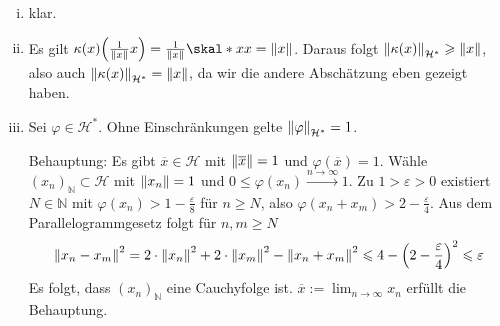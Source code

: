 \begin{enumerate}[(i)]
	\item klar.
	\item Es gilt $\kappa(x) \enbrace*{\frac{1}{\norm{x}}x }= \frac{1}{\norm{x}} \skal*{x}{x} = \norm{x}$. Daraus folgt $\norm[\mathcal{H}^*]{\kappa(x)} \ge \norm{x}$, also
	auch $\norm[\mathcal{H}^*]{\kappa(x)}= \norm{x}$, da wir die andere Abschätzung eben gezeigt haben.
	\item Sei $\varphi \in \mathcal{H}^*$. Ohne Einschränkungen gelte $\norm[\mathcal{H}^*]{\varphi}=1$. 
	
	Behauptung: Es gibt $\overline{x} \in \mathcal{H}$ mit $\norm{\overline{x}}=1 $ und
	$\varphi(\overline{x} )=1$. Wähle $(x_n)_\mathds{N} \subset \mathcal{H}$ mit $\norm{x_n}=1$ und $0\le \varphi(x_n) \xrightarrow{n \to \infty} 1$.
	Zu $1 >\varepsilon>0$ existiert $N \in \mathds{N}$ mit $\varphi(x_n) > 1- \frac{\varepsilon}{8} $ für $n \ge N$, also $\varphi(x_n +x_m) > 2- \frac{\varepsilon}{4}$.
	Aus dem Parallelogrammgesetz folgt für $n,m \ge N$
	\begin{align*}
		\norm{x_n -x_m}^2 = 2 \cdot \norm{x_n}^2 + 2 \cdot \norm{x_m}^2 - \norm{x_n +x_m}^2 \le 4 - \enbrace*{2-\frac{\varepsilon}{4} }^2 \le \varepsilon 
	\end{align*}
	Es folgt, dass $(x_n)_\mathds{N}$ eine Cauchyfolge ist. $\overline{x} := \lim_{ n \to \infty} x_n$ erfüllt die Behauptung.
	

\end{enumerate}
